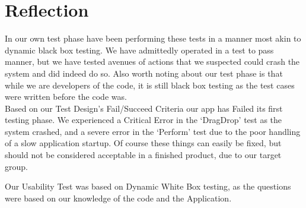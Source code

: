 \section{Reflection}
In our own test phase have been performing these tests in a manner most akin to dynamic black box testing.
We have admittedly operated in a test to pass manner, but we have tested avenues of actions that we suspected could crash the system and did indeed do so.
Also worth noting about our test phase is that while we are developers of the code, it is still black box testing as the test cases were written before the code was.\\
Based on our Test Design's Fail/Succeed Criteria our app has Failed its first testing phase.
We experienced a Critical Error in the `DragDrop' test as the system crashed, and a severe error in the `Perform' test due to the poor handling of a slow application startup.
Of course these things can easily be fixed, but should not be considered acceptable in a finished product, due to our target group.

Our Usability Test was based on Dynamic White Box testing, as the questions were based on our knowledge of the code and the Application.\\

